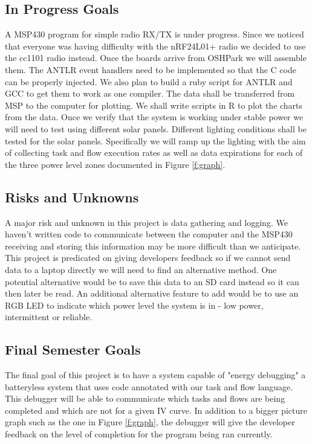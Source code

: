 \subsection{In Progress Goals}

A MSP430 program for simple radio RX/TX is under progress.
Since we noticed that everyone was having difficulty with the nRF24L01+ radio we decided to use the cc1101 radio instead.
Once the boards arrive from OSHPark we will assemble them.
The ANTLR event handlers need to be implemented so that the C code can be properly injected.
We also plan to build a ruby script for ANTLR and GCC to get them to work as one compiler.
The data shall be transferred from MSP to the computer for plotting.
We shall write scripts in R to plot the charts from the data.
Once we verify that the system is working under stable power we will need to test using different solar panels.
Different lighting conditions shall be tested for the solar panels.
Specifically we will ramp up the lighting with the aim of collecting task and flow execution rates as well as data expirations for each of the three power level zones documented in Figure \ref{f:graph}.


\subsection{Risks and Unknowns}
A major risk and unknown in this project is data gathering and logging.
We haven't written code to communicate between the computer and the MSP430 receiving and storing this information may be more difficult than we anticipate.
This project is predicated on giving developers feedback so if we cannot send data to a laptop directly we will need to find an alternative method.
One potential alternative would be to save this data to an SD card instead so it can then later be read.
An additional alternative feature to add would be to use an RGB LED to indicate which power level the system is in - low power, intermittent or reliable.

\subsection{Final Semester Goals}
The final goal of this project is to have a system capable of "energy debugging" a batteryless system that uses code annotated with our task and flow language.
This debugger will be able to communicate which tasks and flows are being completed and which are not for a given IV curve.
In addition to a bigger picture graph such as the one in Figure \ref{f:graph}, the debugger will give the developer feedback on the level of completion for the program being ran currently.
